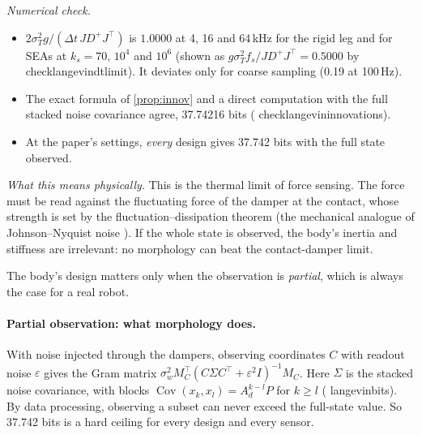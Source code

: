\documentclass[11pt]{article}
\theoremstyle{definition}
\theoremstyle{remark}
\newcommand{\Cov}{\operatorname{Cov}}
\newcommand{\codeus}{\textunderscore\allowbreak}
\newcommand{\code}[1]{{\ttfamily\let\_\codeus\hyphenchar\font=-1 #1}}
\newcommand{\checked}[1]{\par\smallskip\noindent\textit{Numerical check.} #1\par}
\newcommand{\phys}[1]{\par\smallskip\noindent\textit{What this means physically.} #1\par}
\begin{document}
\checked{
\begin{itemize}[nosep]
  \item $2\sigma_T^2 g/(\Delta t\,JD^+J^\top)$ is $1.0000$ at 4, 16 and 64\,kHz for the
        rigid leg and for SEAs at $k_s=70$, $10^4$ and $10^6$ (shown as $g\sigma_T^2
        f_s/JD^+J^\top=0.5000$ by \code{check\_langevin\_dt\_limit}). It deviates only for
        coarse sampling (0.19 at 100\,Hz).
  \item The exact formula of \cref{prop:innov} and a direct computation with the full
        stacked noise covariance agree, 37.74216 bits
        (\code{check\_langevin\_innovations}).
  \item At the paper's settings, \emph{every} design gives 37.742 bits with the full state
        observed.
\end{itemize}}

\phys{This is the thermal limit of force sensing. The force must be read against the
fluctuating force of the damper at the contact, whose strength is set by the
fluctuation--dissipation theorem (the mechanical analogue of Johnson--Nyquist noise \citep{nyquist1928thermal}). If the whole state is observed, the body's inertia and
stiffness are irrelevant: no morphology can beat the contact-damper limit.

The body's design matters only when the observation is \emph{partial}, which is always the
case for a real robot.}

\paragraph{Partial observation: what morphology does.} With noise injected through the
dampers, observing coordinates $C$ with readout noise $\varepsilon$ gives the Gram matrix
$\sigma_w^2M_C^\top(C\Sigma C^\top+\varepsilon^2I)^{-1}M_C$. Here $\Sigma$ is the stacked
noise covariance, with blocks $\Cov(x_k,x_l)=A_d^{k-l}P$ for $k\ge l$
(\code{langevin\_bits}). By data processing, observing a subset can never exceed the
full-state value. So 37.742 bits is a hard ceiling for every design and every sensor.
\end{document}
